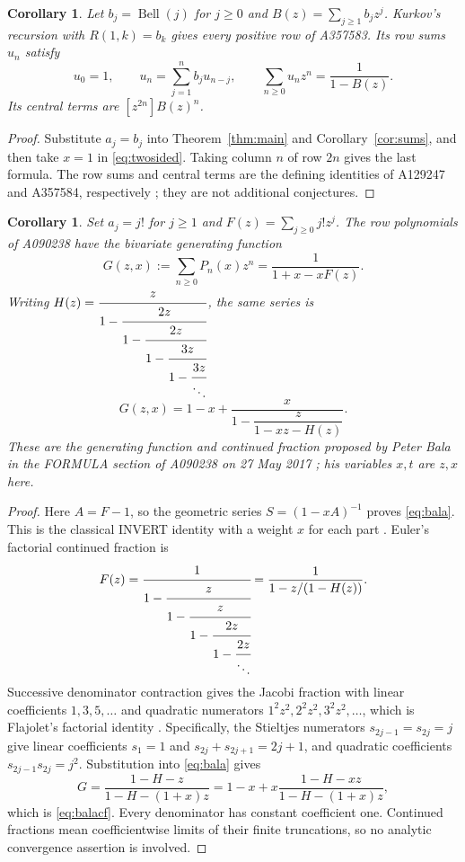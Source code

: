 \documentclass[11pt]{article}
\newtheorem{corollary}[theorem]{Corollary}
\begin{document}
\begin{corollary}\label{cor:bell}
Let $b_j=\operatorname{Bell}(j)$ for $j\geq0$ and
$B(z)=\sum_{j\geq1}b_jz^j$. Kurkov's recursion with $R(1,k)=b_k$
gives every positive row of A357583. Its row sums $u_n$ satisfy
\[
 u_0=1,\qquad u_n=\sum_{j=1}^n b_j u_{n-j},\qquad
 \sum_{n\geq0}u_nz^n=\frac1{1-B(z)}.
\]
Its central terms are $[z^{2n}]B(z)^n$.
\end{corollary}
\begin{proof}
Substitute $a_j=b_j$ into Theorem~\ref{thm:main} and
Corollary~\ref{cor:sums}, and then take $x=1$ in
\eqref{eq:twosided}. Taking column $n$ of row $2n$ gives the last formula.
The row sums and central terms are the defining identities of A129247
and A357584, respectively \cite{bell}; they are not additional conjectures.
\end{proof}

\begin{corollary}\label{cor:factorial}
Set $a_j=j!$ for $j\geq1$ and $F(z)=\sum_{j\geq0}j!z^j$. The
row polynomials of A090238 have the bivariate generating function
\begin{equation}\label{eq:bala}
 G(z,x):=\sum_{n\geq0}P_n(x)z^n=\frac1{1+x-xF(z)}.
\end{equation}
Writing $H(z)=\cfrac{z}{1-\cfrac{2z}{1-\cfrac{2z}{1-\cfrac{3z}{1-\cfrac{3z}{\ddots}}}}}$,
the same series is
\begin{equation}\label{eq:balacf}
 G(z,x)=1-x+\frac{x}{1-\dfrac{z}{1-xz-H(z)}}.
\end{equation}
These are the generating function and continued fraction proposed by
Peter Bala in the FORMULA section of A090238 on 27 May 2017
\cite{factorial}; his variables $x,t$ are $z,x$ here.
\end{corollary}
\begin{proof}
Here $A=F-1$, so the geometric series $S=(1-xA)^{-1}$ proves
\eqref{eq:bala}. This is the classical INVERT identity with a weight
$x$ for each part \cite{bernstein}.
Euler's factorial continued fraction is
\[
 F(z)=\cfrac1{1-\cfrac{z}{1-\cfrac{z}{1-\cfrac{2z}{1-\cfrac{2z}{\ddots}}}}}
     =\frac1{1-z/(1-H(z))}.
\]
Successive denominator contraction gives the Jacobi fraction with linear
coefficients $1,3,5,\ldots$ and quadratic numerators
$1^2z^2,2^2z^2,3^2z^2,\ldots$, which is Flajolet's factorial identity
\cite[Theorem 3B, p.~145]{flajolet}. Specifically, the Stieltjes
numerators $s_{2j-1}=s_{2j}=j$ give linear coefficients $s_1=1$ and
$s_{2j}+s_{2j+1}=2j+1$, and quadratic coefficients
$s_{2j-1}s_{2j}=j^2$.
Substitution into \eqref{eq:bala} gives
\[
 G=\frac{1-H-z}{1-H-(1+x)z}
  =1-x+x\frac{1-H-xz}{1-H-(1+x)z},
\]
which is \eqref{eq:balacf}. Every denominator has constant coefficient
one. Continued fractions mean coefficientwise limits of their finite
truncations, so no analytic convergence assertion is involved.
\end{proof}
\end{document}
